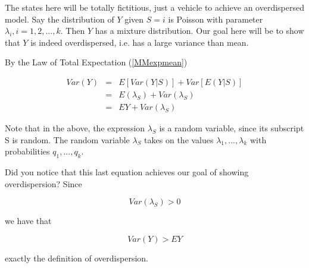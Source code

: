 \documentclass[11pt]{article}
\begin{document}
The states here will be totally fictitious, just a vehicle to achieve an
overdispersed model.  Say the distribution of $Y$ given $S = i$ is
Poisson with parameter $\lambda_i, i = 1,2,...,k$.  Then $Y$ has a
mixture distribution.  Our goal here will be to show that $Y$ is indeed
overdispersed, i.e. has a large variance than mean.

By the Law of Total Expectation (\ref{MMexpmean})

\begin{eqnarray}
Var(Y) &=& E[Var(Y|S)] + Var[E(Y|S)] \\ 
&=& E(\lambda_S) + Var(\lambda_S) \label{thislast} \\
&=& EY + Var(\lambda_S) \label{thislast} 
\end{eqnarray}


Note that in the above, the expression $\lambda_S$ is a random variable,
since its subscript S is random.  The random variable $\lambda_S$ takes
on the values $\lambda_1,...,\lambda_k$ with probabilities
$q_1,...,q_k$.


Did you notice that this last equation achieves our goal of showing
overdispersion?  Since

\begin{equation}
Var(\lambda_S) > 0
\end{equation}

we have that

\begin{equation}
Var(Y) > EY
\end{equation}

exactly the definition of overdispersion.
\end{document}

